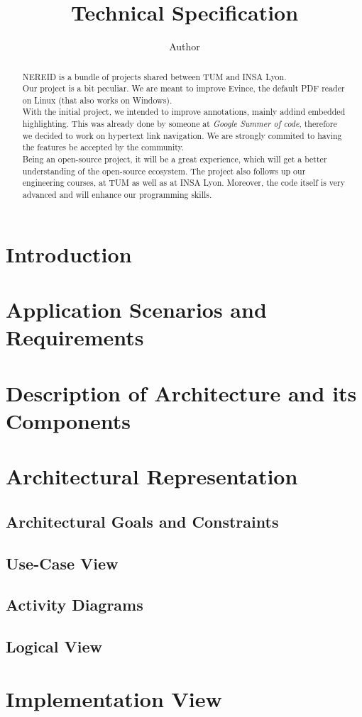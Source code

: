 \documentclass{article}%
\begin{document}
\title{ Technical Specification }
\author[]{ Author}
\maketitle


\begin{abstract}

NEREID is a bundle of projects shared between TUM and INSA Lyon. \\

Our project is a bit peculiar. We are meant to improve Evince, the default PDF
reader on Linux (that also works on Windows).\\

With the initial project, we intended to improve annotations, mainly addind
embedded highlighting. This was already done by someone at \emph{Google Summer
of code}, therefore we decided to work on hypertext link navigation. We are
strongly commited to having the features be accepted by the community. \\

Being an open-source project, it will be a great experience, which will get a
better understanding of the open-source ecosystem. The project also follows up
our engineering courses, at TUM as well as at INSA Lyon. Moreover, the code
itself is very advanced and will enhance our programming skills.
\end{abstract}

\newpage
\tableofcontents

\newpage
\section{Introduction}

\section{Application Scenarios and Requirements}

\section{Description of Architecture and its Components}

\section{Architectural Representation}
\subsection{Architectural Goals and Constraints}
\subsection{Use-Case View}
\subsection{Activity Diagrams}
\subsection{Logical View}
\section{Implementation View}
\end{document}
